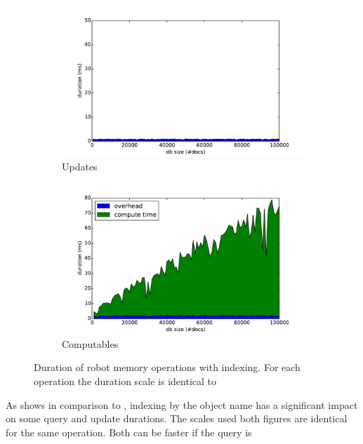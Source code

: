 \begin{figure}[ht!]
\begin{subfigure}[b]{0.49\textwidth}
    \includegraphics[width=1.15\textwidth]{plots/update-durations-index}
    \caption{Updates}
    \label{fig:update-index}
  \end{subfigure}
  \begin{subfigure}[b]{0.49\textwidth}
    \hspace{-3mm}
    \includegraphics[width=1.15\textwidth]{plots/computable-durations-index}
    \caption{Computables}
    \label{fig:computable-index}
  \end{subfigure}
  \caption[Duration of robot memory operations with indexing]{Duration
    of robot memory operations with indexing. For each operation the
    duration scale is identical to ~}
  \label{fig:eval-indexing}
\end{figure}
As  shows in comparison to
, indexing by the object name has a
significant impact on some query and update durations. The scales used both figures
are identical for the same operation. Both can be faster if the query is
